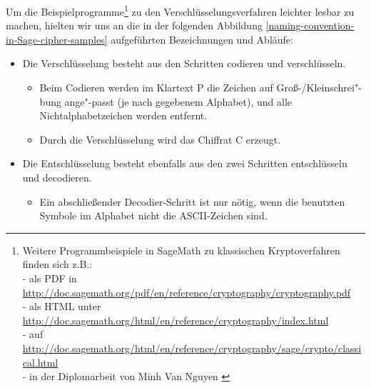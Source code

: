 \begin{refsegment}
\noindent Um die Beispielprogramme\footnote{%
     Weitere Programmbeispiele in SageMath zu klassischen Kryptoverfahren finden
     sich z.B.:\\
     - als PDF in \url{http://doc.sagemath.org/pdf/en/reference/cryptography/cryptography.pdf}\\
     - als HTML unter \url{http://doc.sagemath.org/html/en/reference/cryptography/index.html}\\
     - auf \url{http://doc.sagemath.org/html/en/reference/cryptography/sage/crypto/classical.html}\\
     - in der Diplomarbeit von Minh Van Nguyen \cite{Nguyen2009b}
     }
zu den Verschlüsselungsver\-fah\-ren leichter lesbar zu machen, hielten wir uns
an die in der folgenden Abbildung \ref{naming-convention-in-Sage-cipher-samples}
aufgeführten Bezeichnungen und Abläufe:
\begin{itemize}
  \item Die Verschlüsselung besteht aus den Schritten codieren und
  verschlüsseln.
  \begin{itemize}
    \item Beim Codieren werden im Klartext P die Zeichen auf
          Groß-/Kleinschrei"-bung ange"-passt (je nach gegebenem Alphabet),
          und alle Nichtalphabetzeichen werden entfernt.
    \item Durch die Verschlüsselung wird das Chiffrat C erzeugt.
  \end{itemize}
  \item Die Entschlüsselung besteht ebenfalls aus den zwei Schritten entschlüsseln und decodieren.
  \begin{itemize}
    \item Ein abschließender Decodier-Schritt ist nur nötig, wenn die benutzten
          Symbole im Alphabet nicht die ASCII-Zeichen sind.
  \end{itemize}
\end{itemize}


\end{refsegment}

